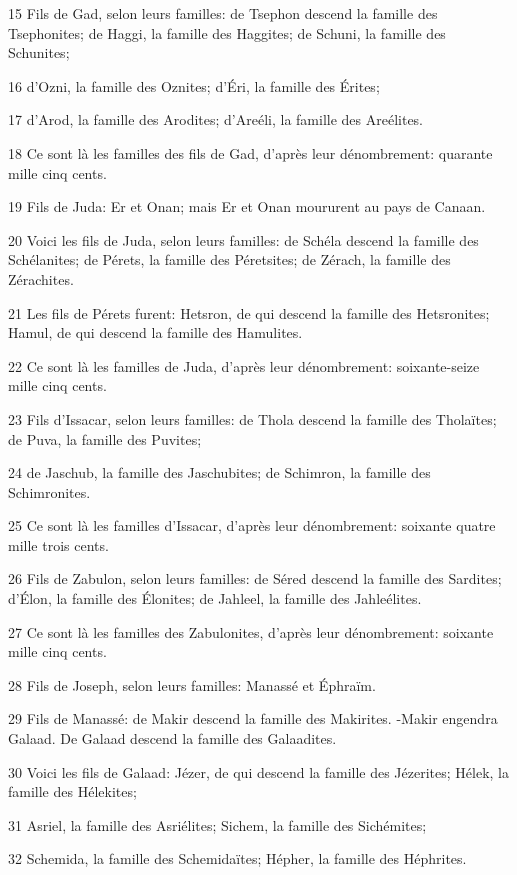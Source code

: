\par 15 Fils de Gad, selon leurs familles: de Tsephon descend la famille des Tsephonites; de Haggi, la famille des Haggites; de Schuni, la famille des Schunites;
\par 16 d'Ozni, la famille des Oznites; d'Éri, la famille des Érites;
\par 17 d'Arod, la famille des Arodites; d'Areéli, la famille des Areélites.
\par 18 Ce sont là les familles des fils de Gad, d'après leur dénombrement: quarante mille cinq cents.
\par 19 Fils de Juda: Er et Onan; mais Er et Onan moururent au pays de Canaan.
\par 20 Voici les fils de Juda, selon leurs familles: de Schéla descend la famille des Schélanites; de Pérets, la famille des Péretsites; de Zérach, la famille des Zérachites.
\par 21 Les fils de Pérets furent: Hetsron, de qui descend la famille des Hetsronites; Hamul, de qui descend la famille des Hamulites.
\par 22 Ce sont là les familles de Juda, d'après leur dénombrement: soixante-seize mille cinq cents.
\par 23 Fils d'Issacar, selon leurs familles: de Thola descend la famille des Tholaïtes; de Puva, la famille des Puvites;
\par 24 de Jaschub, la famille des Jaschubites; de Schimron, la famille des Schimronites.
\par 25 Ce sont là les familles d'Issacar, d'après leur dénombrement: soixante quatre mille trois cents.
\par 26 Fils de Zabulon, selon leurs familles: de Séred descend la famille des Sardites; d'Élon, la famille des Élonites; de Jahleel, la famille des Jahleélites.
\par 27 Ce sont là les familles des Zabulonites, d'après leur dénombrement: soixante mille cinq cents.
\par 28 Fils de Joseph, selon leurs familles: Manassé et Éphraïm.
\par 29 Fils de Manassé: de Makir descend la famille des Makirites. -Makir engendra Galaad. De Galaad descend la famille des Galaadites.
\par 30 Voici les fils de Galaad: Jézer, de qui descend la famille des Jézerites; Hélek, la famille des Hélekites;
\par 31 Asriel, la famille des Asriélites; Sichem, la famille des Sichémites;
\par 32 Schemida, la famille des Schemidaïtes; Hépher, la famille des Héphrites.
